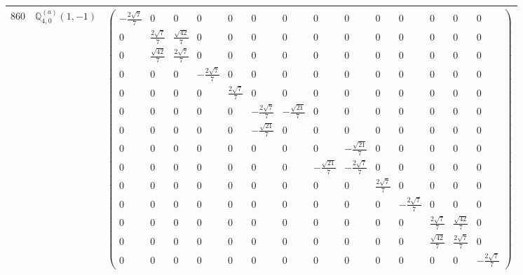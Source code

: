 \documentclass[fleqn,8pt,landscape]{jsarticle}
\begin{document}
\begin{center}
\begin{longtable}{ccc}
$ 860 $ & $ \mathbb{Q}_{4,0}^{(a)}(1,-1) $ & $ \begin{pmatrix} - \frac{2 \sqrt{7}}{7} & 0 & 0 & 0 & 0 & 0 & 0 & 0 & 0 & 0 & 0 & 0 & 0 & 0 \\ 0 & \frac{2 \sqrt{7}}{7} & \frac{\sqrt{42}}{7} & 0 & 0 & 0 & 0 & 0 & 0 & 0 & 0 & 0 & 0 & 0 \\ 0 & \frac{\sqrt{42}}{7} & \frac{2 \sqrt{7}}{7} & 0 & 0 & 0 & 0 & 0 & 0 & 0 & 0 & 0 & 0 & 0 \\ 0 & 0 & 0 & - \frac{2 \sqrt{7}}{7} & 0 & 0 & 0 & 0 & 0 & 0 & 0 & 0 & 0 & 0 \\ 0 & 0 & 0 & 0 & \frac{2 \sqrt{7}}{7} & 0 & 0 & 0 & 0 & 0 & 0 & 0 & 0 & 0 \\ 0 & 0 & 0 & 0 & 0 & - \frac{2 \sqrt{7}}{7} & - \frac{\sqrt{21}}{7} & 0 & 0 & 0 & 0 & 0 & 0 & 0 \\ 0 & 0 & 0 & 0 & 0 & - \frac{\sqrt{21}}{7} & 0 & 0 & 0 & 0 & 0 & 0 & 0 & 0 \\ 0 & 0 & 0 & 0 & 0 & 0 & 0 & 0 & - \frac{\sqrt{21}}{7} & 0 & 0 & 0 & 0 & 0 \\ 0 & 0 & 0 & 0 & 0 & 0 & 0 & - \frac{\sqrt{21}}{7} & - \frac{2 \sqrt{7}}{7} & 0 & 0 & 0 & 0 & 0 \\ 0 & 0 & 0 & 0 & 0 & 0 & 0 & 0 & 0 & \frac{2 \sqrt{7}}{7} & 0 & 0 & 0 & 0 \\ 0 & 0 & 0 & 0 & 0 & 0 & 0 & 0 & 0 & 0 & - \frac{2 \sqrt{7}}{7} & 0 & 0 & 0 \\ 0 & 0 & 0 & 0 & 0 & 0 & 0 & 0 & 0 & 0 & 0 & \frac{2 \sqrt{7}}{7} & \frac{\sqrt{42}}{7} & 0 \\ 0 & 0 & 0 & 0 & 0 & 0 & 0 & 0 & 0 & 0 & 0 & \frac{\sqrt{42}}{7} & \frac{2 \sqrt{7}}{7} & 0 \\ 0 & 0 & 0 & 0 & 0 & 0 & 0 & 0 & 0 & 0 & 0 & 0 & 0 & - \frac{2 \sqrt{7}}{7} \end{pmatrix} $ \\ \hline

\end{longtable}
\end{center}
\end{document}
